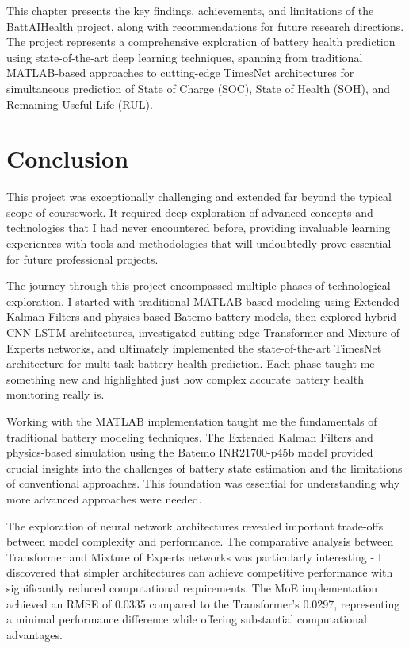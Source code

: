 This chapter presents the key findings, achievements, and limitations of the BattAIHealth project, along with recommendations for future research directions. The project represents a comprehensive exploration of battery health prediction using state-of-the-art deep learning techniques, spanning from traditional MATLAB-based approaches to cutting-edge TimesNet architectures for simultaneous prediction of State of Charge (SOC), State of Health (SOH), and Remaining Useful Life (RUL).

\section{Conclusion}
\label{sec:conclusion}

This project was exceptionally challenging and extended far beyond the typical scope of coursework. It required deep exploration of advanced concepts and technologies that I had never encountered before, providing invaluable learning experiences with tools and methodologies that will undoubtedly prove essential for future professional projects.

The journey through this project encompassed multiple phases of technological exploration. I started with traditional MATLAB-based modeling using Extended Kalman Filters and physics-based Batemo battery models, then explored hybrid CNN-LSTM architectures, investigated cutting-edge Transformer and Mixture of Experts networks, and ultimately implemented the state-of-the-art TimesNet architecture for multi-task battery health prediction. Each phase taught me something new and highlighted just how complex accurate battery health monitoring really is.

Working with the MATLAB implementation taught me the fundamentals of traditional battery modeling techniques. The Extended Kalman Filters and physics-based simulation using the Batemo INR21700-p45b model provided crucial insights into the challenges of battery state estimation and the limitations of conventional approaches. This foundation was essential for understanding why more advanced approaches were needed.

The exploration of neural network architectures revealed important trade-offs between model complexity and performance. The comparative analysis between Transformer and Mixture of Experts networks was particularly interesting - I discovered that simpler architectures can achieve competitive performance with significantly reduced computational requirements. The MoE implementation achieved an RMSE of 0.0335 compared to the Transformer's 0.0297, representing a minimal performance difference while offering substantial computational advantages.

